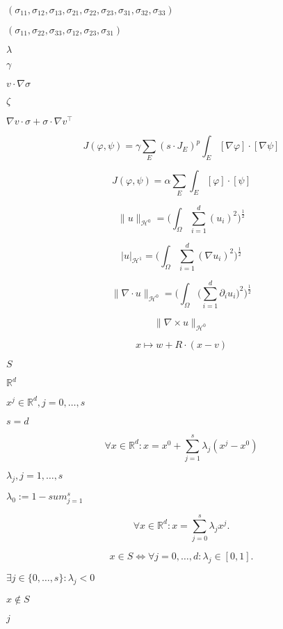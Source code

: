 \documentclass{article}
\begin{document}
$(\sigma_{11}, \sigma_{12}, \sigma_{13}, \sigma_{21}, \sigma_{22}, \sigma_{23}, \sigma_{31}, \sigma_{32}, \sigma_{33})$
\pagebreak

$(\sigma_{11}, \sigma_{22}, \sigma_{33}, \sigma_{12}, \sigma_{23}, \sigma_{31})$
\pagebreak

$\lambda$
\pagebreak

$\gamma$
\pagebreak

$v\cdot\nabla\sigma$
\pagebreak

$\zeta$
\pagebreak

$\nabla v\cdot\sigma + \sigma\cdot\nabla v^\top$
\pagebreak

\[J(\varphi,\psi) = \gamma \sum_E (s\cdot J_E)^{p} \int_E [\nabla \varphi]\cdot[\nabla\psi]\]
\pagebreak

\[J(\varphi,\psi) = \alpha \sum_E \int_E [\varphi]\cdot[\psi]\]
\pagebreak

\[ \|u\|_{\mathcal{H}^0} = \Big(\int_\Omega \sum_{i=1}^d (u_i)^2\Big)^{\frac{1}{2}}\]
\pagebreak

\[ |u|_{\mathcal{H}^1} = \Big(\int_\Omega \sum_{i=1}^d (\nabla u_i)^2\Big)^{\frac{1}{2}}\]
\pagebreak

\[ \| \nabla \cdot u\|_{\mathcal{H}^0} = \Big(\int_\Omega \big(\sum_{i=1}^d \partial_i u_i\big)^2\Big)^{\frac{1}{2}}\]
\pagebreak

\[ \| \nabla \times u\|_{\mathcal{H}^0} \]
\pagebreak

\[ x \mapsto w + R\cdot (x - v) \]
\pagebreak

$ S $
\pagebreak

$ \mathbb{R}^d $
\pagebreak

$ x^j \in \mathbb{R}^d, j = 0, \dots, s $
\pagebreak

$ s = d $
\pagebreak

\[
  \forall x \in \mathbb{R}^d: x = x^0 + \sum_{j=1}^s \lambda_j (x^j - x^0)
\]
\pagebreak

$ \lambda_j, j=1,\dots,s $
\pagebreak

$ \lambda_0 := 1 - sum_{j=1}^s $
\pagebreak

\[
  \forall x \in \mathbb{R}^d: x = \sum_{j=0}^s \lambda_j x^j.
\]
\pagebreak

\[
  x \in S \Leftrightarrow  \forall j = 0, \dots, d: \lambda_j \in [0, 1] .
\]
\pagebreak

$ \exists j \in \{ 0, \dots, s \}: \lambda_j < 0 $
\pagebreak

$ x \notin S $
\pagebreak

$ j $
\pagebreak
\end{document}
